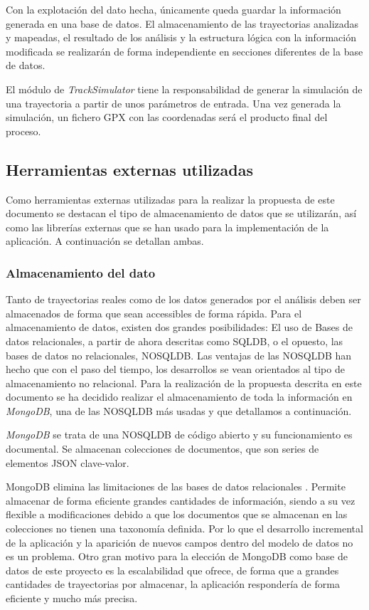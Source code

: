 Con la explotación del dato hecha, únicamente queda guardar la información generada en una base de datos.
El almacenamiento de las trayectorias analizadas y mapeadas, el resultado de los análisis y la estructura 
lógica con la información modificada se realizarán de forma independiente en secciones diferentes de la 
base de datos.

El módulo de \textit{TrackSimulator} tiene la responsabilidad de generar la simulación de una trayectoria 
a partir de unos parámetros de entrada. Una vez generada la simulación, un fichero \ac{GPX} con las 
coordenadas será el producto final del proceso.
 
\subsection{Herramientas externas utilizadas}
Como herramientas externas utilizadas para la realizar la propuesta de este documento se destacan 
el tipo de almacenamiento de datos que se utilizarán, así como las librerías externas que se han usado 
para la implementación de la aplicación. A continuación se detallan ambas.

\subsubsection{Almacenamiento del dato}
Tanto de trayectorias reales como de los datos generados por el análisis deben ser almacenados 
de forma que sean accessibles de forma rápida.
Para el almacenamiento de datos, existen dos grandes posibilidades: El uso de Bases de datos relacionales, 
a partir de ahora descritas como \ac{SQLDB},
o el opuesto, las bases de datos no relacionales, \ac{NOSQLDB}.
Las ventajas de las \ac{NOSQLDB} han hecho que con el paso del tiempo, los desarrollos se vean orientados 
al tipo de almacenamiento no relacional.
Para la realización de la propuesta descrita en este documento se ha decidido realizar el almacenamiento de 
toda la información en \textit{MongoDB}, una de las \ac{NOSQLDB}
más usadas y que detallamos a continuación.

\textit{MongoDB} se trata de una \ac{NOSQLDB} de código abierto y su funcionamiento es documental. 
Se almacenan colecciones de documentos, que son series de elementos JSON clave-valor.

MongoDB elimina las limitaciones de las bases de datos relacionales \cite{Mongo01}. 
Permite almacenar de forma eficiente grandes cantidades de información, siendo
a su vez flexible a modificaciones debido a que los documentos que se almacenan en las colecciones no tienen 
una taxonomía definida. Por lo que el desarrollo incremental de la aplicación y la aparición de nuevos 
campos dentro del modelo de datos no es un problema.
Otro gran motivo para la elección de MongoDB como base de datos de este proyecto es la escalabilidad 
que ofrece, de forma que a grandes cantidades de trayectorias por almacenar, la aplicación respondería 
de forma eficiente y mucho más precisa.

